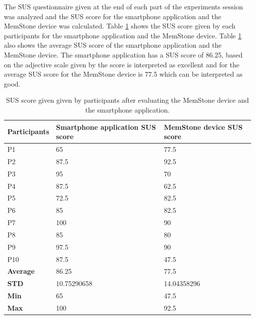 \documentclass[mscthesis]{usiinfthesis}
\begin{document}
The SUS questionnaire given at the end of each part of the experiments session was analyzed and the SUS score for the smartphone application and the MemStone device was calculated. Table \ref{tab10} shows the SUS score given by each participants for the smartphone application and the MemStone device. Table \ref{tab10} also shows the average SUS score of the smartphone application and the MemStone device. The smartphone application has a SUS score of 86.25, based on the adjective scale given by \citeauthor{bangor_determining_2009} the score is interpreted as excellent and for the average SUS score for the MemStone device is 77.5 which can be interpreted as good. 
\begin{table}[!ht]
\centering
\begin{tabular}{|l|l|l|}
\hline
\textbf{Participants} & \textbf{Smartphone application SUS score} & \textbf{MemStone device SUS score} \\ \hline
P1                    & 65                                 & 77.5                        \\ \hline
P2                    & 87.5                               & 92.5                        \\ \hline
P3                    & 95                                 & 70                          \\ \hline
P4                    & 87.5                               & 62.5                        \\ \hline
P5                    & 72.5                               & 82.5                        \\ \hline
P6                    & 85                                 & 82.5                        \\ \hline
P7                    & 100                                & 90                          \\ \hline
P8                    & 85                                 & 80                          \\ \hline
P9                    & 97.5                               & 90                          \\ \hline
P10                   & 87.5                               & 47.5                        \\ \hline
\textbf{Average}      & 86.25                              & 77.5                        \\ \hline
\textbf{STD}          & 10.75290658                        & 14.04358296                 \\ \hline
\textbf{Min}          & 65                                 & 47.5                        \\ \hline
\textbf{Max}          & 100                                & 92.5                        \\ \hline
\end{tabular}
\caption{SUS score given given by participants after evaluating the MemStone device and the smartphone application.}
\label{tab10}
\end{table}
\end{document}
